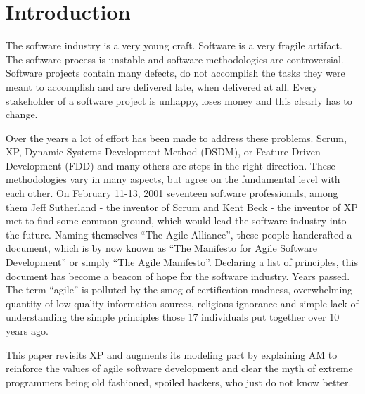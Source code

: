 \section{Introduction}
The software industry is a very young craft. Software is a very
fragile artifact. The software process is unstable and software methodologies
are controversial. Software projects contain many defects, do not accomplish
the tasks they were meant to accomplish and are delivered late, when delivered at
all. Every stakeholder of a software project is unhappy, loses money and this
clearly has to change.

Over the years a lot of effort has been made to address these problems. Scrum,
XP, Dynamic Systems Development Method (DSDM), or Feature-Driven Development
(FDD) and many others are steps in the right direction. These methodologies vary
in many aspects, but agree on the fundamental level with each other. On
February 11-13, 2001 seventeen software professionals, among them Jeff
Sutherland - the inventor of Scrum and Kent Beck - the inventor of XP met to
find some common ground, which would lead the software industry into the future.
Naming themselves \enquote{The Agile Alliance}, these people handcrafted a
document, which is by now known as \enquote{The Manifesto for Agile Software
Development} or simply \enquote{The Agile Manifesto}. Declaring a list of
principles, this document has become a beacon of hope for the software industry.
Years passed. The term \enquote{agile} is polluted by the smog of certification
madness, overwhelming quantity of low quality information sources, religious
ignorance and simple lack of understanding the simple principles those 17
individuals put together over 10 years ago.

This paper revisits XP and augments its modeling part by explaining AM to
reinforce the values of agile software development and clear the myth of
extreme programmers being old fashioned, spoiled hackers, who just do not
know better.

